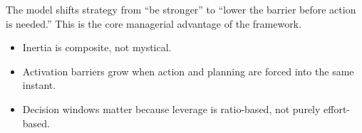 \begin{insightbox}
The model shifts strategy from ``be stronger'' to ``lower the barrier before
action is needed.'' This is the core managerial advantage of the framework.
\end{insightbox}

\begin{summarybox}
\begin{itemize}
  \item Inertia is composite, not mystical.
  \item Activation barriers grow when action and planning are forced into the
        same instant.
  \item Decision windows matter because leverage is ratio-based, not purely
        effort-based.
\end{itemize}
\end{summarybox}


